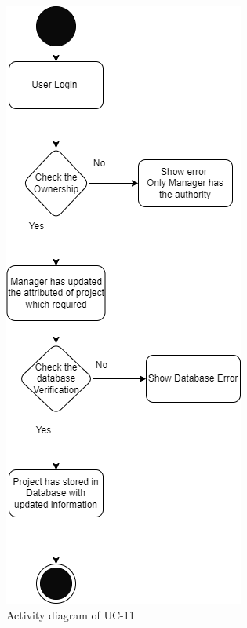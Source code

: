 \begin{figure}[H]
    \centering
    \includegraphics[scale=0.5]{./diagrams/Activity Diagram/ad-11.png}
    \caption{Activity diagram of UC-11}
    \label{fig:act-11}

\end{figure}


